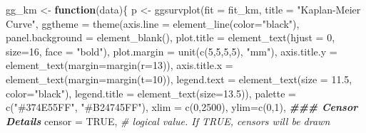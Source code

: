 \documentclass[
]{book}
\newenvironment{Shaded}{\begin{snugshade}}{\end{snugshade}}
\newcommand{\AttributeTok}[1]{\textcolor[rgb]{0.77,0.63,0.00}{#1}}
\newcommand{\CommentTok}[1]{\textcolor[rgb]{0.56,0.35,0.01}{\textit{#1}}}
\newcommand{\ConstantTok}[1]{\textcolor[rgb]{0.00,0.00,0.00}{#1}}
\newcommand{\ControlFlowTok}[1]{\textcolor[rgb]{0.13,0.29,0.53}{\textbf{#1}}}
\newcommand{\DecValTok}[1]{\textcolor[rgb]{0.00,0.00,0.81}{#1}}
\newcommand{\DocumentationTok}[1]{\textcolor[rgb]{0.56,0.35,0.01}{\textbf{\textit{#1}}}}
\newcommand{\FloatTok}[1]{\textcolor[rgb]{0.00,0.00,0.81}{#1}}
\newcommand{\FunctionTok}[1]{\textcolor[rgb]{0.00,0.00,0.00}{#1}}
\newcommand{\NormalTok}[1]{#1}
\newcommand{\OtherTok}[1]{\textcolor[rgb]{0.56,0.35,0.01}{#1}}
\newcommand{\StringTok}[1]{\textcolor[rgb]{0.31,0.60,0.02}{#1}}
\begin{document}
\begin{Shaded}
\begin{Highlighting}[]
\NormalTok{gg\_km }\OtherTok{\textless{}{-}} \ControlFlowTok{function}\NormalTok{(data)\{}
\NormalTok{  p }\OtherTok{\textless{}{-}} \FunctionTok{ggsurvplot}\NormalTok{(}\AttributeTok{fit =}\NormalTok{ fit\_km,}
                  \AttributeTok{title =} \StringTok{"Kaplan{-}Meier Curve"}\NormalTok{,}
                  \AttributeTok{ggtheme =} \FunctionTok{theme}\NormalTok{(}\AttributeTok{axis.line =} \FunctionTok{element\_line}\NormalTok{(}\AttributeTok{color=}\StringTok{"black"}\NormalTok{), }
                                  \AttributeTok{panel.background =} \FunctionTok{element\_blank}\NormalTok{(),}
                                  \AttributeTok{plot.title =} \FunctionTok{element\_text}\NormalTok{(}\AttributeTok{hjust =} \DecValTok{0}\NormalTok{, }\AttributeTok{size=}\DecValTok{16}\NormalTok{, }\AttributeTok{face =} \StringTok{"bold"}\NormalTok{),}
                                  \AttributeTok{plot.margin =} \FunctionTok{unit}\NormalTok{(}\FunctionTok{c}\NormalTok{(}\DecValTok{5}\NormalTok{,}\DecValTok{5}\NormalTok{,}\DecValTok{5}\NormalTok{,}\DecValTok{5}\NormalTok{), }\StringTok{"mm"}\NormalTok{),}
                                  \AttributeTok{axis.title.y =} \FunctionTok{element\_text}\NormalTok{(}\AttributeTok{margin=}\FunctionTok{margin}\NormalTok{(}\AttributeTok{r=}\DecValTok{13}\NormalTok{)),}
                                  \AttributeTok{axis.title.x =} \FunctionTok{element\_text}\NormalTok{(}\AttributeTok{margin=}\FunctionTok{margin}\NormalTok{(}\AttributeTok{t=}\DecValTok{10}\NormalTok{)),}
                                  \AttributeTok{legend.text =} \FunctionTok{element\_text}\NormalTok{(}\AttributeTok{size =} \FloatTok{11.5}\NormalTok{, }\AttributeTok{color=}\StringTok{"black"}\NormalTok{),}
                                  \AttributeTok{legend.title =} \FunctionTok{element\_text}\NormalTok{(}\AttributeTok{size=}\FloatTok{13.5}\NormalTok{)),}
                  \AttributeTok{palette =} \FunctionTok{c}\NormalTok{(}\StringTok{"\#374E55FF"}\NormalTok{, }\StringTok{"\#B24745FF"}\NormalTok{),}
                  \AttributeTok{xlim =} \FunctionTok{c}\NormalTok{(}\DecValTok{0}\NormalTok{,}\DecValTok{2500}\NormalTok{), }
                  \AttributeTok{ylim=}\FunctionTok{c}\NormalTok{(}\DecValTok{0}\NormalTok{,}\DecValTok{1}\NormalTok{),}
                  \DocumentationTok{\#\#\# Censor Details }
                  \AttributeTok{censor =} \ConstantTok{TRUE}\NormalTok{, }\CommentTok{\# logical value. If TRUE, censors will be drawn}

\end{Highlighting}
\end{Shaded}
\end{document}
